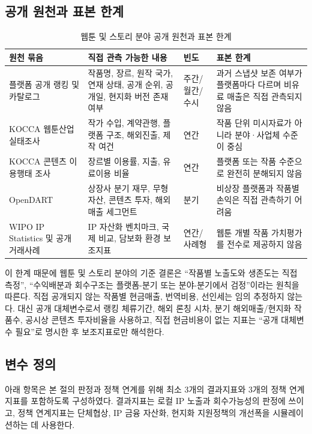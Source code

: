 \documentclass[11pt,a4paper]{report}
\begin{document}
\subsection{공개 원천과 표본 한계}
\begin{table}[H]
  \centering
  \small
  \caption{웹툰 및 스토리 분야 공개 원천과 표본 한계}\label{tab:webtoon_source_limits}
  \begin{tabular}{L{2.8cm}L{4.1cm}L{2.3cm}L{4.8cm}}
    \toprule
    원천 묶음 & 직접 관측 가능한 내용 & 빈도 & 표본 한계 \\
    \midrule
    플랫폼 공개 랭킹 및 카탈로그 & 작품명, 장르, 원작 국가, 연재 상태, 공개 순위, 공개일, 현지화 버전 존재 여부 & 주간/월간/수시 & 과거 스냅샷 보존 여부가 플랫폼마다 다르며 비유료 매출은 직접 관측되지 않음 \\
    KOCCA 웹툰산업 실태조사 & 작가 수입, 계약관행, 플랫폼 구조, 해외진출, 제작 여건 & 연간 & 작품 단위 미시자료가 아니라 분야·사업체 수준이 중심 \\
    KOCCA 콘텐츠 이용행태 조사 & 장르별 이용률, 지출, 유료이용 비율 & 연간 & 플랫폼 또는 작품 수준으로 완전히 분해되지 않음 \\
    OpenDART & 상장사 분기 재무, 무형자산, 콘텐츠 투자, 해외 매출 세그먼트 & 분기 & 비상장 플랫폼과 작품별 손익은 직접 관측하기 어려움 \\
    WIPO IP Statistics 및 공개 거래사례 & IP 자산화 벤치마크, 국제 비교, 담보화 환경 보조지표 & 연간/사례형 & 웹툰 개별 작품 가치평가를 전수로 제공하지 않음 \\
    \bottomrule
  \end{tabular}
\end{table}

이 한계 때문에 웹툰 및 스토리 분야의 기준 결론은 ``작품별 노출도와 생존도는 직접 측정'', ``수익배분과 회수구조는 플랫폼-분기 또는 분야-분기에서 검정''이라는 원칙을 따른다. 직접 공개되지 않는 작품별 현금매출, 번역비용, 선인세는 임의 추정하지 않는다. 대신 공개 대체변수로서 랭킹 체류기간, 해외 론칭 시차, 분기 해외매출/현지화 작품수, 공시상 콘텐츠 투자비율을 사용하고, 직접 현금비용이 없는 지표는 ``공개 대체변수 필요''로 명시한 후 보조지표로만 해석한다.

\subsection{변수 정의}
아래 항목은 본 절의 판정과 정책 연계를 위해 최소 3개의 결과지표와 3개의 정책 연계지표를 포함하도록 구성하였다. 결과지표는 로컬 IP 노출과 회수가능성의 판정에 쓰이고, 정책 연계지표는 단체협상, IP 금융 자산화, 현지화 지원정책의 개선폭을 시뮬레이션하는 데 사용한다.
\end{document}
